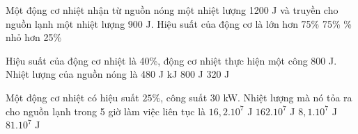 		\begin{vidu}%
			Một động cơ nhiệt nhận từ nguồn nóng một nhiệt lượng 1200 J và truyền cho nguồn lạnh một nhiệt lượng 900 J. Hiệu suất của động cơ là
			\choice
			{lớn hơn 75\%}
			{75\%}
			{\%}
			{nhỏ hơn 25\%}
		\end{vidu}
		\begin{vidu}%
			Hiệu suất của động cơ nhiệt là 40\%, động cơ nhiệt thực hiện một công 800 J.  Nhiệt lượng của nguồn nóng là
			\choice
			{480 J}
			{ kJ}
			{800 J}
			{320 J}
		\end{vidu}
		
		\begin{vidu}%
			Một động cơ nhiệt có hiệu suất $25\%$, công suất 30 kW. Nhiệt lượng mà nó tỏa ra cho nguồn lạnh trong 5 giờ làm việc liên tục là
			\choice
			{$16,2. 10^7$ J}
			{\True $162. 10^7$ J}
			{$8,1. 10^7$ J}
			{$81. 10^7$ J}
		\end{vidu}
		
